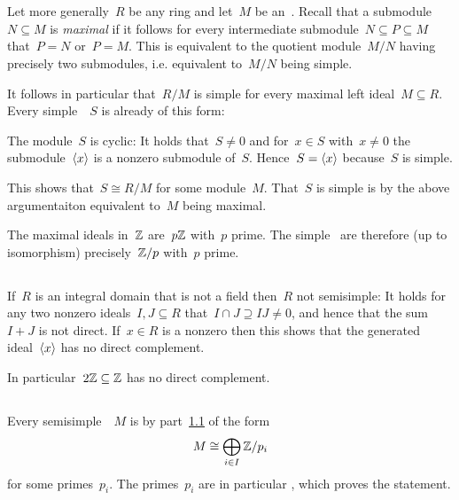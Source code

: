 \section{}





\subsection{}
\label{classification of simple modules}

Let more generally~$R$ be any ring and let~$M$ be an~{}.
Recall that a submodule~$N \subseteq M$ is \emph{maximal} if it follows for every intermediate submodule~$N \subseteq P \subseteq M$ that~$P= N$ or~$P = M$.
This is equivalent to the quotient module~$M/N$ having precisely two submodules, i.e. equivalent to~$M/N$ being simple.

It follows in particular that~$R/M$ is simple for every maximal left ideal~$M \subseteq R$.
Every simple~~$S$ is already of this form:

The module~$S$ is cyclic:
It holds that~$S \neq 0$ and for~$x \in S$ with~$x \neq 0$ the submodule~$\langle x\rangle$ is a nonzero submodule of~$S$.
Hence~$S = \langle x\rangle$ because~$S$ is simple.

This shows that~$S \cong R/M$ for some module~$M$.
That~$S$ is simple is by the above argumentaiton equivalent to~$M$ being maximal.

The maximal ideals in~$\Integer$ are~$p \mathbb{Z}$ with~$p$ prime.
The simple~{\modules{$\Integer$}} are therefore (up to isomorphism) precisely~$\mathbb{Z}/p$ with~$p$ prime.




\subsection{}

If~$R$ is an integral domain that is not a field then~$R$ not semisimple:
It holds for any two nonzero ideals~$I, J \subseteq R$ that~$I \cap J \supseteq IJ \neq 0$, and hence that the sum~$I + J$ is not direct.
If~$x \in R$ is a nonzero  then this shows that the generated ideal~$\langle x\rangle$ has no direct complement.

In particular~$2 \mathbb{Z} \subseteq \mathbb{Z}$ has no direct complement.





\subsection{}

Every semisimple~~$M$ is by part~\ref{classification of simple modules} of the form
\[
  M \cong \bigoplus_{i \in I} \mathbb{Z}/p_i
\]
for some primes~$p_i$.
The primes~$p_i$ are in particular , which proves the statement.




